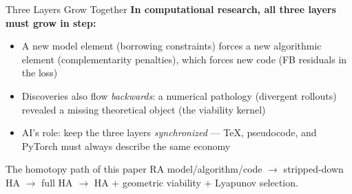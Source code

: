 \documentclass[10pt,aspectratio=169]{beamer}
\begin{document}
\begin{frame}{Three Layers Grow Together}
\textbf{In computational research, all three layers must grow in step:}

\smallskip
\begin{center}
\end{center}

\smallskip
\begin{itemize}\small\itemsep2pt
    \item A new model element (borrowing constraints) forces a new algorithmic element
          (complementarity penalties), which forces new code (FB residuals in the loss)
    \item Discoveries also flow \emph{backwards}: a numerical pathology (divergent rollouts)
          revealed a missing theoretical object (the viability kernel)
    \item AI's role: keep the three layers \emph{synchronized} --- TeX, pseudocode, and PyTorch
          must always describe the same economy
\end{itemize}

\smallskip
\begin{block}{The homotopy path of this paper}
\small RA model/algorithm/code $\rightarrow$ stripped-down HA $\rightarrow$ full HA $\rightarrow$
HA $+$ geometric viability $+$ Lyapunov selection.
\end{block}
\end{frame}
\end{document}
